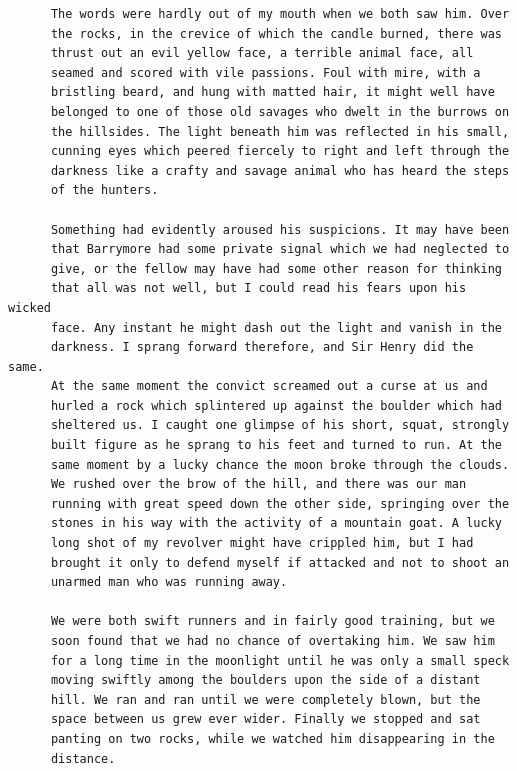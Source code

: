 \documentclass{article}
\begin{document}
\begin{verbatim}
      The words were hardly out of my mouth when we both saw him. Over
      the rocks, in the crevice of which the candle burned, there was
      thrust out an evil yellow face, a terrible animal face, all
      seamed and scored with vile passions. Foul with mire, with a
      bristling beard, and hung with matted hair, it might well have
      belonged to one of those old savages who dwelt in the burrows on
      the hillsides. The light beneath him was reflected in his small,
      cunning eyes which peered fiercely to right and left through the
      darkness like a crafty and savage animal who has heard the steps
      of the hunters.

      Something had evidently aroused his suspicions. It may have been
      that Barrymore had some private signal which we had neglected to
      give, or the fellow may have had some other reason for thinking
      that all was not well, but I could read his fears upon his wicked
      face. Any instant he might dash out the light and vanish in the
      darkness. I sprang forward therefore, and Sir Henry did the same.
      At the same moment the convict screamed out a curse at us and
      hurled a rock which splintered up against the boulder which had
      sheltered us. I caught one glimpse of his short, squat, strongly
      built figure as he sprang to his feet and turned to run. At the
      same moment by a lucky chance the moon broke through the clouds.
      We rushed over the brow of the hill, and there was our man
      running with great speed down the other side, springing over the
      stones in his way with the activity of a mountain goat. A lucky
      long shot of my revolver might have crippled him, but I had
      brought it only to defend myself if attacked and not to shoot an
      unarmed man who was running away.

      We were both swift runners and in fairly good training, but we
      soon found that we had no chance of overtaking him. We saw him
      for a long time in the moonlight until he was only a small speck
      moving swiftly among the boulders upon the side of a distant
      hill. We ran and ran until we were completely blown, but the
      space between us grew ever wider. Finally we stopped and sat
      panting on two rocks, while we watched him disappearing in the
      distance.


\end{verbatim}
\end{document}
